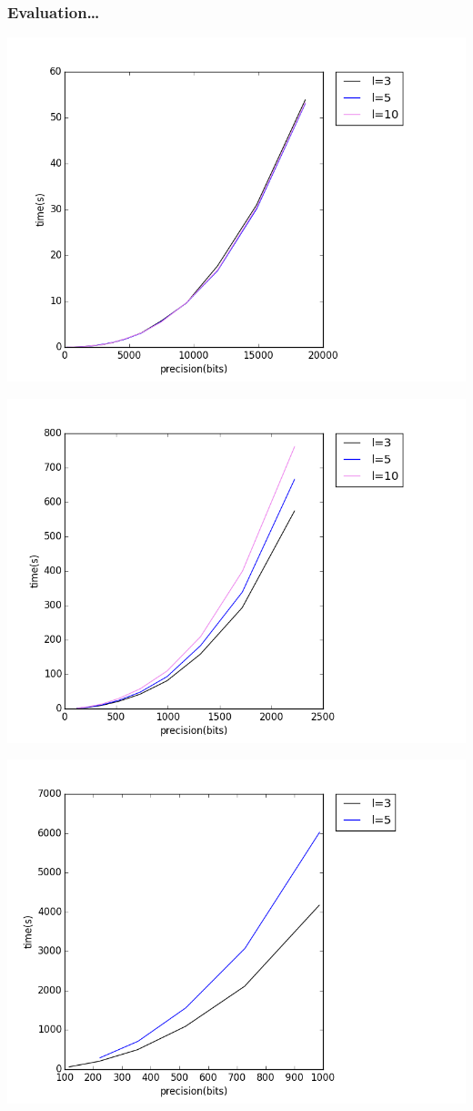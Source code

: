 \documentclass[handout,xcolor=pdftex,dvipsnames,table]{beamer}
\begin{document}
\begin{frame}
  \frametitle{Evaluation\dots}
  \begin{minipage}{0.48\textwidth}
  \includegraphics[width=1.2\textwidth]{time_0}
  \end{minipage}
  \begin{minipage}{0.48\textwidth}
  \includegraphics[width=1.2\textwidth]{time_1}
  \end{minipage}
\end{frame}
\addtocounter{framenumber}{-1}
\begin{frame}
  \includegraphics[width=1.0\textwidth]{time_2}
\end{frame}
\end{document}
